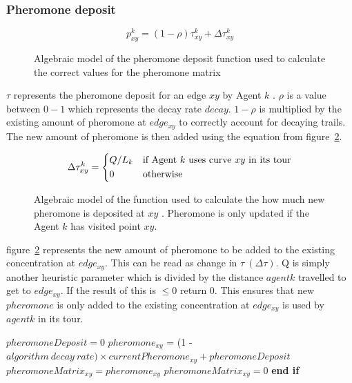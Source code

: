 \documentclass[10pt,a4paper]{article}
\begin{document}
\subsubsection{Pheromone deposit}


\label{sssec:pherodepo}
\begin{figure}[H]
\Large
\begin{equation}
p_{xy}^{k} = (1 - \rho)\tau_{xy}^{k} + \Delta\tau_{xy}^{k}
\end{equation}

\caption{Algebraic model of the pheromone deposit function used to calculate the correct values for the pheromone matrix
\label{fig:pheromonefunc}
\cite{pheromone:image}}
\end{figure}

\noindent
$\tau$ represents the pheromone deposit for an edge $xy$ by Agent $k$ \cite{tjung:aco:blog}. $\rho$ is a value between $0-1$ which represents the decay rate $decay$. $1 - \rho$ is multiplied by the existing amount of pheromone at $edge_{xy}$ to correctly account for decaying trails. The new amount of pheromone is then added using the equation from figure~\ref{fig:newpheromonefunc}. 


\begin{figure}[H]
\Large
\begin{equation}
\Delta\tau_{xy}^{k} = 
\begin{dcases*}
Q/L_k & \text{if Agent $k$ uses curve $xy$ in its tour}\\
0 & \text{otherwise}
\end{dcases*}
\end{equation}

\caption{Algebraic model of the function used to calculate the how much new pheromone is deposited at $xy$
\label{fig:newpheromonefunc}
\cite{new:pheromone:image}. Pheromone is only updated if the Agent $k$ has visited point $xy$.}

\end{figure}

\noindent
figure~\ref{fig:newpheromonefunc} represents the new amount of pheromone to be added to the existing concentration at $edge_{xy}$. This can be read as change in $\tau\ (\Delta \tau)$. Q is simply another heuristic parameter which is divided by the distance $agent k$ travelled to get to $edge_{xy}$. If the result of this is $\leq 0$ return 0. This ensures that new $pheromone$ is only added to the existing concentration at $edge_{xy}$ is used by $agent k$ in its tour.

\begin{algorithm}[H]
\caption{Pseudo-code for Pheromone function - figures~\ref{fig:pheromonefunc}, \ref{fig:newpheromonefunc}}
\label{aco:pseudo:pherofunc}
\begin{algorithmic}[1]
\State $pheromoneDeposit = 0$
\EndIf
\State $pheromone_{xy}$ = (1 - $algorithm\ decay\ rate) \times currentPheromone_{xy} + pheromoneDeposit$
\State $pheromoneMatrix_{xy} = pheromone_{xy}$
\Else
\State $pheromoneMatrix_{xy} = 0$
\EndIf \State \textbf{end if}
\end{algorithmic}
\end{algorithm}

\clearpage

\nocite{*}


\end{document}
